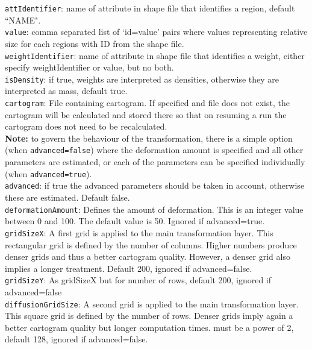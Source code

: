 \documentclass{article}
\begin{document}
{\tt attIdentifier}: name of attribute in shape file that identifies a region, default ``NAME".\\

{\tt value}: comma separated list of `id=value' pairs where values representing relative size for each regions with ID from the shape file.\\

{\tt weightIdentifier}: name of attribute in shape file that identifies a weight, either specify weightIdentifier or value, but no both.\\

{\tt isDensity}: if true, weights are interpreted as densities, otherwise they are interpreted as mass, default true.\\

{\tt cartogram}: File containing cartogram. If specified and file does not exist, the cartogram will be calculated and stored there so that on resuming a run the cartogram does not need to be recalculated.\\

{\bf Note:} to govern the behaviour of the transformation, there is a simple option (when {\tt advanced=false}) where the deformation amount is specified and all other parameters are estimated, or each of the parameters can be specified individually (when {\tt advanced=true}).\\

{\tt advanced}: if true the advanced parameters should be taken in account, otherwise these are estimated. Default false.\\

{\tt deformationAmount}: Defines the amount of deformation. This is an integer value between 0 and 100. The default value is 50. Ignored if advanced=true.\\

{\tt gridSizeX}: A first grid is applied to the main transformation layer. 
This rectangular grid is defined by the number of columns. 
Higher numbers produce denser grids and thus a better cartogram quality. 
However, a denser grid also implies a longer treatment. 
Default 200, ignored if advanced=false.\\

{\tt gridSizeY}: As gridSizeX but for number of rows, default 200, ignored if advanced=false\\

{\tt diffusionGridSize}: A second grid is applied to the main transformation layer. 
This square grid is defined by the number of rows. 
Denser grids imply again a better cartogram quality but longer computation times.
must be a power of 2, default 128, ignored if advanced=false.\\
\end{document}
